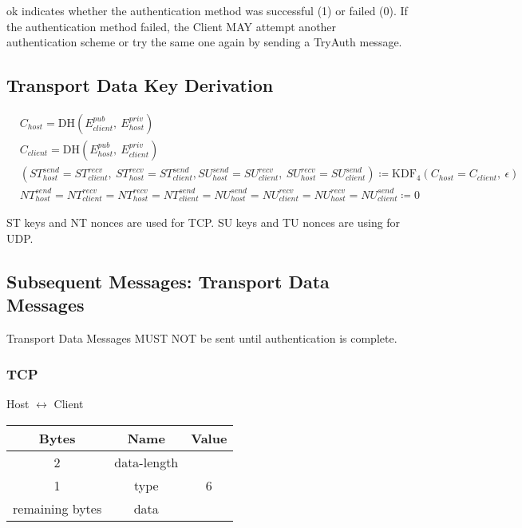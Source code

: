 ok indicates whether the authentication method was successful (1) or failed (0).
If the authentication method failed, the Client MAY attempt another authentication scheme or try the same one again by sending a TryAuth message.

\subsection{Transport Data Key Derivation}

\begin{align*}
    & C_{host} = \text{DH}(E_{client}^{pub},\ E_{host}^{priv})\\
    & C_{client} = \text{DH}(E_{host}^{pub},\ E_{client}^{priv})\\
    & (\mathit{ST}_{host}^{send} = \mathit{ST}_{client}^{recv},\ \mathit{ST}_{host}^{recv} = \mathit{ST}_{client}^{send}, \mathit{SU}_{host}^{send} = \mathit{SU}_{client}^{recv},\ \mathit{SU}_{host}^{recv} = \mathit{SU}_{client}^{send}) \coloneqq \text{KDF}_4(C_{host} = C_{client},
    \ \epsilon) \\
    & \mathit{NT}_{host}^{send} = \mathit{NT}_{client}^{recv} = \mathit{NT}_{host}^{recv} = \mathit{NT}_{client}^{send} = \mathit{NU}_{host}^{send} = \mathit{NU}_{client}^{recv} = \mathit{NU}_{host}^{recv} = \mathit{NU}_{client}^{send} \coloneqq 0
\end{align*}

ST keys and NT nonces are used for TCP. SU keys and TU nonces are using for UDP.

\subsection{Subsequent Messages: Transport Data Messages}

Transport Data Messages MUST NOT be sent until authentication is complete.

\subsubsection{TCP}

\begin{center}
    Host $\leftrightarrow$ Client\\
    \begin{tabular}{|c|c|c|}
        \hline
        \textbf{Bytes}  & \textbf{Name} & \textbf{Value} \\
        \hline
        2               & data-length   &                \\
        \hline
        1               & type          & 6              \\
        \hline
        remaining bytes & data          &                \\
        \hline
    \end{tabular}
\end{center}

